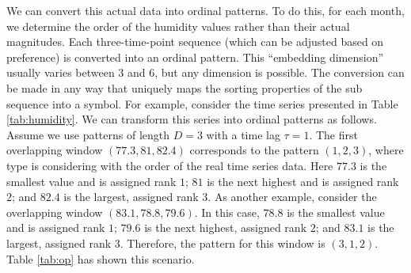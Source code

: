 We can convert this actual data into ordinal patterns. 
To do this, for each month, we determine the order of the humidity values rather than their actual magnitudes. 
Each three-time-point sequence (which can be adjusted based on preference) is converted into an ordinal pattern.
This ``embedding dimension'' usually varies between $3$ and $6$, but any dimension is possible.
The conversion can be made in any way that uniquely maps the sorting properties of the sub sequence into a symbol.
For example, consider the time series presented in Table \ref{tab:humidity}. We can transform this series into ordinal patterns as follows. Assume we use patterns of length $D=3$ with a time lag $\tau=1$. 
The first overlapping window $(77.3,81,82.4)$ corresponds to the pattern  $(1,2,3)$, where type is considering with the order of the real time series data. Here $77.3$ is the smallest value and is assigned rank $1$; $81$ is the next highest and is assigned rank $2$; and $82.4$ is the largest, assigned rank $3$. As another example, consider the overlapping window $(83.1, 78.8, 79.6)$.  In this case, $78.8$ is the smallest value and is assigned rank $1$; $79.6$ is the next highest, assigned rank $2$; and $83.1$ is the largest, assigned rank $3$. Therefore, the pattern for this window is $(3,1,2)$.
Table \ref{tab:op} has shown this scenario. 



